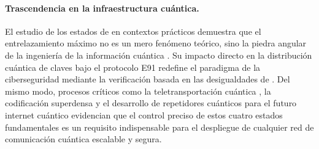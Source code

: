 \documentclass[11pt,a4paper,spanish]{book}
\begin{document}
\paragraph{Trascendencia en la infraestructura cuántica.} El estudio de los estados de \cite{bell1964} en contextos prácticos demuestra que el entrelazamiento máximo \citep{schrodinger1935} no es un mero fenómeno teórico, sino la piedra angular de la ingeniería de la información cuántica \citep{nielsen2010}. Su impacto directo en la distribución cuántica de claves bajo el protocolo E91 \citep{ekert1991} redefine el paradigma de la ciberseguridad mediante la verificación basada en las desigualdades de \cite{bell1964}. Del mismo modo, procesos críticos como la teletransportación cuántica \citep{bennett1993}, la codificación superdensa \citep{bennett1992dense} y el desarrollo de repetidores cuánticos para el futuro internet cuántico \citep{kimble2008} evidencian que el control preciso de estos cuatro estados fundamentales es un requisito indispensable para el despliegue de cualquier red de comunicación cuántica escalable y segura.
\end{document}
